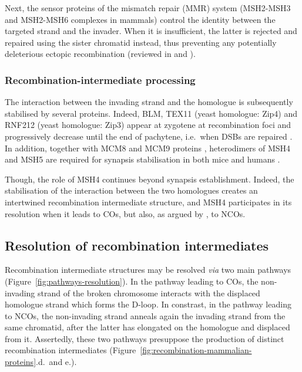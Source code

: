 Next, the sensor proteins of the mismatch repair (MMR) system (MSH2-MSH3 and MSH2-MSH6 complexes in mammals) control the identity between the targeted strand and the invader.
When it is insufficient, the latter is rejected and repaired using the sister chromatid instead, thus preventing any potentially deleterious ectopic recombination (reviewed in \citealp{surtees2004mismatch} and \citealp{goldfarb2010frequent}).


\subsubsection{Recombination-intermediate processing}
The interaction between the invading strand and the homologue is subsequently stabilised by several proteins.
Indeed, BLM, TEX11 (yeast homologue: Zip4) and RNF212 (yeast homologue: Zip3) appear at zygotene at recombination foci and progressively decrease until the end of pachytene, i.e.\ when DSBs are repaired \citep[reviewed in][]{baudat2013meiotic}. 
In addition, together with MCM8 and MCM9 proteins \citep{lutzmann2012mcm8}, heterodimers of MSH4 and MSH5 \citep{scully1997association} are required for synapsis stabilisation in both mice \citep{devries1999mouse,kneitz2000muts} and humans \citep{snowden2004hmsh4hmsh5}.

Though, the role of MSH4 continues beyond synapsis establishment. 
Indeed, the stabilisation of the interaction between the two homologues creates an intertwined recombination intermediate structure, and MSH4 participates in its resolution when it leads to COs, but also, as argued by \citet{baudat2007regulating}, to NCOs.





\subsection{Resolution of recombination intermediates}
\label{chap2:resolution-intermediates}

Recombination intermediate structures may be resolved \textit{via} two main pathways (Figure~\ref{fig:pathways-resolution}).
In the pathway leading to COs, the non-invading strand of the broken chromosome interacts with the displaced homologue strand which forms the D-loop.
In constrast, in the pathway leading to NCOs, the non-invading strand anneals again the invading strand from the same chromatid, after the latter has elongated on the homologue and displaced from it.
Assertedly, these two pathways presuppose the production of distinct recombination intermediates (Figure~\ref{fig:recombination-mammalian-proteins}.d.\ and e.).


